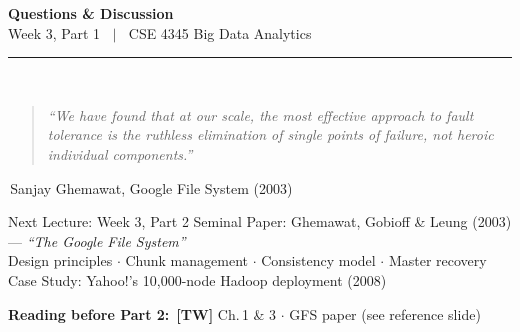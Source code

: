 \documentclass[aspectratio=169,10pt]{beamer}
\begin{document}
\begin{frame}[c]
  \begin{center}
    {\Large\bfseries Questions \& Discussion}\\[10pt]
    {\large Week 3, Part 1 $\;\mid\;$ CSE 4345 Big Data Analytics}\\[8pt]
    \textcolor{PUGray}{\rule{7cm}{0.5pt}}\\[10pt]
    \begin{quote}
      \itshape ``We have found that at our scale, the most effective approach to fault tolerance
                 is the ruthless elimination of single points of failure, not heroic individual components.''
    \end{quote}
    \hfill\textemdash\,Sanjay Ghemawat, Google File System (2003)
    \vspace{14pt}
    \begin{block}{\centering Next Lecture: Week 3, Part 2}
      \centering
      Seminal Paper: Ghemawat, Gobioff \& Leung (2003) — \textit{``The Google File System''}\\[4pt]
      \small Design principles $\cdot$ Chunk management $\cdot$ Consistency model $\cdot$ Master recovery\\
      Case Study: Yahoo!'s 10{,}000-node Hadoop deployment (2008)
    \end{block}
    \vspace{6pt}
    \textbf{Reading before Part 2:}\ \textbf{[TW]} Ch.\,1 \& 3 $\cdot$ GFS paper (see reference slide)
  \end{center}
\end{frame}

\end{document}
